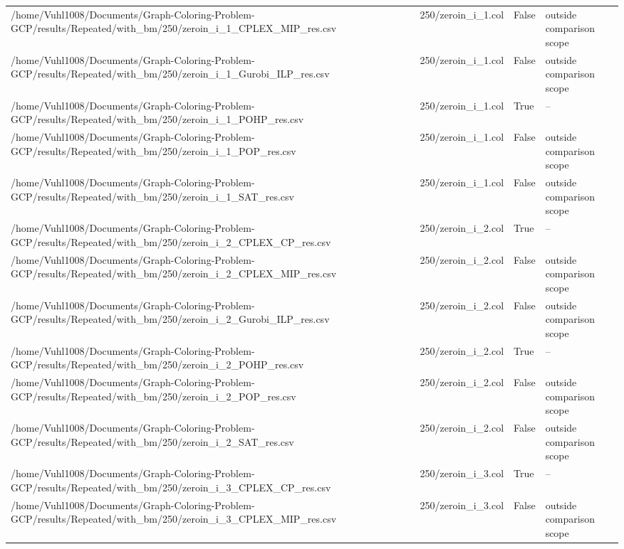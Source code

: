 \begin{table}[htbp]
\begin{tabular}{llll}
/home/Vuhl1008/Documents/Graph-Coloring-Problem-GCP/results/Repeated/with\_bm/250/zeroin\_i\_1\_CPLEX\_MIP\_res.csv & 250/zeroin\_i\_1.col & False & outside comparison scope \\
/home/Vuhl1008/Documents/Graph-Coloring-Problem-GCP/results/Repeated/with\_bm/250/zeroin\_i\_1\_Gurobi\_ILP\_res.csv & 250/zeroin\_i\_1.col & False & outside comparison scope \\
/home/Vuhl1008/Documents/Graph-Coloring-Problem-GCP/results/Repeated/with\_bm/250/zeroin\_i\_1\_POHP\_res.csv & 250/zeroin\_i\_1.col & True & -- \\
/home/Vuhl1008/Documents/Graph-Coloring-Problem-GCP/results/Repeated/with\_bm/250/zeroin\_i\_1\_POP\_res.csv & 250/zeroin\_i\_1.col & False & outside comparison scope \\
/home/Vuhl1008/Documents/Graph-Coloring-Problem-GCP/results/Repeated/with\_bm/250/zeroin\_i\_1\_SAT\_res.csv & 250/zeroin\_i\_1.col & False & outside comparison scope \\
/home/Vuhl1008/Documents/Graph-Coloring-Problem-GCP/results/Repeated/with\_bm/250/zeroin\_i\_2\_CPLEX\_CP\_res.csv & 250/zeroin\_i\_2.col & True & -- \\
/home/Vuhl1008/Documents/Graph-Coloring-Problem-GCP/results/Repeated/with\_bm/250/zeroin\_i\_2\_CPLEX\_MIP\_res.csv & 250/zeroin\_i\_2.col & False & outside comparison scope \\
/home/Vuhl1008/Documents/Graph-Coloring-Problem-GCP/results/Repeated/with\_bm/250/zeroin\_i\_2\_Gurobi\_ILP\_res.csv & 250/zeroin\_i\_2.col & False & outside comparison scope \\
/home/Vuhl1008/Documents/Graph-Coloring-Problem-GCP/results/Repeated/with\_bm/250/zeroin\_i\_2\_POHP\_res.csv & 250/zeroin\_i\_2.col & True & -- \\
/home/Vuhl1008/Documents/Graph-Coloring-Problem-GCP/results/Repeated/with\_bm/250/zeroin\_i\_2\_POP\_res.csv & 250/zeroin\_i\_2.col & False & outside comparison scope \\
/home/Vuhl1008/Documents/Graph-Coloring-Problem-GCP/results/Repeated/with\_bm/250/zeroin\_i\_2\_SAT\_res.csv & 250/zeroin\_i\_2.col & False & outside comparison scope \\
/home/Vuhl1008/Documents/Graph-Coloring-Problem-GCP/results/Repeated/with\_bm/250/zeroin\_i\_3\_CPLEX\_CP\_res.csv & 250/zeroin\_i\_3.col & True & -- \\
/home/Vuhl1008/Documents/Graph-Coloring-Problem-GCP/results/Repeated/with\_bm/250/zeroin\_i\_3\_CPLEX\_MIP\_res.csv & 250/zeroin\_i\_3.col & False & outside comparison scope \\

\end{tabular}
\end{table}

